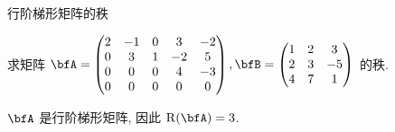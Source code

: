 \begin{frame}{行阶梯形矩阵的秩}
	\onslide<+->
	\begin{example}
		求矩阵 $\bfA=\begin{pmatrix}
			2&-1&0&3&-2\\
			0&3&1&-2&5\\
			0&0&0&4&-3\\
			0&0&0&0&0
		\end{pmatrix},\bfB=\begin{pmatrix}
			1&2&3\\
			2&3&-5\\
			4&7&1
		\end{pmatrix}$ 的秩.
	\end{example}
	\onslide<+->
	\begin{solution}
		$\bfA$ 是行阶梯形矩阵, 因此 $\rank(\bfA)=3$.
		\onslide<+->{\[\bfB\wsim{r_2-2r_1}{r_3-4r_1}\begin{pmatrix}
			1&2&3\\
			0&-1&-11\\
			0&-1&-11
		\end{pmatrix}\wsim{r_3-r_2}{-r_2}\begin{pmatrix}
			1&2&3\\
			0&1&11\\
			0&0&0
		\end{pmatrix}\onslide<+->{\implies \rank(\bfB)=2.}\]}
		\vspace{-\baselineskip}
	\end{solution}
\end{frame}


